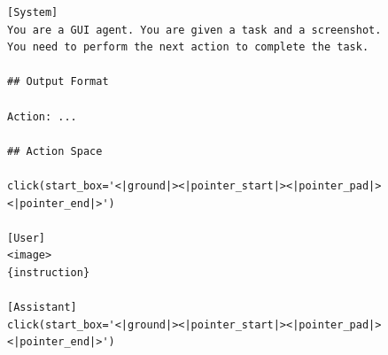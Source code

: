 \begin{figure}[t]
\begin{tcolorbox}[colback=white, width=\linewidth, breakable, enhanced, 
                  title=Prompt for the UI-TARS-1.5 Retrofit Model, fonttitle=\bfseries, label=prompt:uitars-retrofit]

\lstset{
basicstyle=\scriptsize\ttfamily,
    columns=fullflexible,
    breaklines=true,
    breakatwhitespace=false,
    showstringspaces=false,
    lineskip=-1pt
}

\begin{lstlisting}
[System]
You are a GUI agent. You are given a task and a screenshot.
You need to perform the next action to complete the task.

## Output Format

Action: ...

## Action Space

click(start_box='<|ground|><|pointer_start|><|pointer_pad|><|pointer_end|>')

[User]
<image>
{instruction}

[Assistant]
click(start_box='<|ground|><|pointer_start|><|pointer_pad|><|pointer_end|>')
\end{lstlisting}

\end{tcolorbox}
\end{figure}
